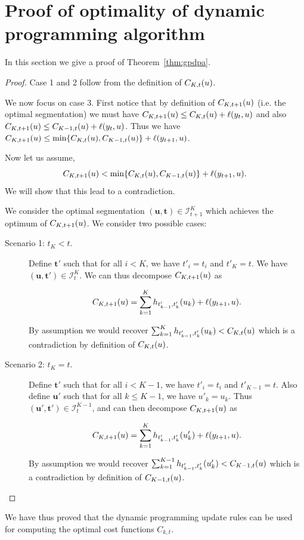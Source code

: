 \documentclass{article}
\begin{document}
\section{Proof of optimality of 
dynamic programming algorithm}
\label{sec:proof}
In this section we give a proof of Theorem~\ref{thm:gpdpa}.
\begin{proof}
Case 1 and 2 follow from the definition of $C_{K,t}(u)$.

We now focus on case 3.
First notice that by definition of $C_{K,t+1}(u)$ (i.e. the optimal segmentation) we must have
$C_{K,t+1}(u) \leq C_{K,t}(u) + \ell(y_t,u)$ and also
$C_{K,t+1}(u) \leq C_{K-1,t}(u) + \ell(y_t,u)$. Thus we have
$C_{K,t+1}(u) \leq \min \{ C_{K,t}(u) , C_{K-1,t}(u) \} + \ell(y_{t+1},u)$.

Now let us assume,
$$C_{K,t+1}(u) < \min \{ C_{K,t}(u) , C_{K-1,t}(u) \} + \ell(y_{t+1},u).$$
We will show that this lead to a contradiction.

We consider the optimal segmentation
$(\mathbf u, \mathbf t)\in{\mathcal I}_{t+1}^K$ which achieves the
optimum of $C_{K,t+1}(u)$. We consider two possible cases:
\begin{description}
\item[Scenario 1: $t_K < t$.]  Define $\mathbf t'$ such that for all
  $i < K$, we have $t'_i = t_i$ and $t'_K = t$.  We have
  $(\mathbf u, \mathbf t')\in{\mathcal I}_{t}^K$.  We can thus
  decompose $C_{K,t+1}(u)$ as

$$C_{K,t+1}(u) = \sum_{k=1}^K
  h_{t'_{k-1}, t'_k}(u_k) + \ell(y_{t+1},u).$$ 

By assumption we would recover $\sum_{k=1}^K h_{t'_{k-1}, t'_k}(u_k) < C_{K,t}(u)$ which is a contradiction
by definition of $C_{K,t}(u)$. 

\item[Scenario 2: $t_K=t$.]  Define $\mathbf t'$ such that for all
  $i < K-1$, we have $t'_i = t_i$ and $t'_{K-1} = t$. Also define
  $\mathbf u'$ such that for all $k \leq K-1$, we have $u'_k = u_k$.
  Thus $(\mathbf u', \mathbf t')\in{\mathcal I}_{t}^{K-1}$, and can
  then decompose $C_{K,t+1}(u)$ as

$$C_{K,t+1}(u) = \sum_{k=1}^K
  h_{t'_{k-1}, t'_k}(u'_k) + \ell(y_{t+1},u).$$ 

By assumption we would recover $\sum_{k=1}^{K-1} h_{t'_{k-1}, t'_k}(u'_k) < C_{K-1,t}(u)$ which is a contradiction
by definition of $C_{K-1,t}(u)$. 
\end{description}
\end{proof}
We have thus proved that the dynamic programming update rules can be
used for computing the optimal cost functions $C_{k,t}$.
\end{document}
